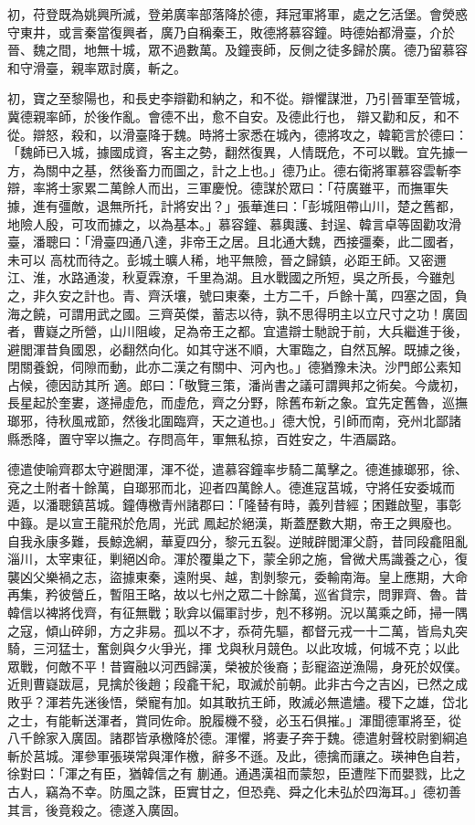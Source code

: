 \begin{pinyinscope}
 初，苻登既為姚興所滅，登弟廣率部落降於德，拜冠軍將軍，處之乞活堡。會熒惑守東井，或言秦當復興者，廣乃自稱秦王，敗德將慕容鐘。時德始都滑臺，介於晉、魏之間，地無十城，眾不過數萬。及鐘喪師，反側之徒多歸於廣。德乃留慕容和守滑臺，親率眾討廣，斬之。



 初，寶之至黎陽也，和長史李辯勸和納之，和不從。辯懼謀泄，乃引晉軍至管城，冀德親率師，於後作亂。會德不出，愈不自安。及德此行也，
 辯又勸和反，和不從。辯怒，殺和，以滑臺降于魏。時將士家悉在城內，德將攻之，韓範言於德曰：「魏師已入城，據國成資，客主之勢，翻然復異，人情既危，不可以戰。宜先據一方，為關中之基，然後畜力而圖之，計之上也。」德乃止。德右衛將軍慕容雲斬李辯，率將士家累二萬餘人而出，三軍慶悅。德謀於眾曰：「苻廣雖平，而撫軍失據，進有彊敵，退無所托，計將安出？」張華進曰：「彭城阻帶山川，楚之舊都，地險人殷，可攻而據之，以為基本。」慕容鐘、慕輿護、封逞、韓言卓等固勸攻滑臺，潘聰曰：「滑臺四通八達，非帝王之居。且北通大魏，西接彊秦，此二國者，未可以
 高枕而待之。彭城土曠人稀，地平無險，晉之歸鎮，必距王師。又密邇江、淮，水路通浚，秋夏霖潦，千里為湖。且水戰國之所短，吳之所長，今雖剋之，非久安之計也。青、齊沃壤，號曰東秦，土方二千，戶餘十萬，四塞之固，負海之饒，可謂用武之國。三齊英傑，蓄志以待，孰不思得明主以立尺寸之功！廣固者，曹嶷之所營，山川阻峻，足為帝王之都。宜遣辯士馳說于前，大兵繼進于後，避閭渾昔負國恩，必翻然向化。如其守迷不順，大軍臨之，自然瓦解。既據之後，閉關養銳，伺隙而動，此亦二漢之有關中、河內也。」德猶豫未決。沙門郎公素知占候，德因訪其所
 適。郎曰：「敬覽三策，潘尚書之議可謂興邦之術矣。今歲初，長星起於奎婁，遂掃虛危，而虛危，齊之分野，除舊布新之象。宜先定舊魯，巡撫瑯邪，待秋風戒節，然後北圍臨齊，天之道也。」德大悅，引師而南，兗州北鄙諸縣悉降，置守宰以撫之。存問高年，軍無私掠，百姓安之，牛酒屬路。



 德遣使喻齊郡太守避閭渾，渾不從，遣慕容鐘率步騎二萬擊之。德進據瑯邪，徐、兗之土附者十餘萬，自瑯邪而北，迎者四萬餘人。德進寇莒城，守將任安委城而遁，以潘聰鎮莒城。鐘傳檄青州諸郡曰：「隆替有時，義列昔經；困難啟聖，事彰中籙。是以宣王龍飛於危周，光武
 鳳起於絕漢，斯蓋歷數大期，帝王之興廢也。自我永康多難，長鯨逸網，華夏四分，黎元五裂。逆賊辟閭渾父蔚，昔同段龕阻亂淄川，太宰東征，剿絕凶命。渾於覆巢之下，蒙全卵之施，曾微犬馬識養之心，復襲凶父樂禍之志，盜據東秦，遠附吳、越，割剝黎元，委輸南海。皇上應期，大命再集，矜彼營丘，暫阻王略，故以七州之眾二十餘萬，巡省貸宗，問罪齊、魯。昔韓信以裨將伐齊，有征無戰；耿弇以偏軍討步，剋不移朔。況以萬乘之師，掃一隅之寇，傾山碎卵，方之非易。孤以不才，忝荷先驅，都督元戎一十二萬，皆烏丸突騎，三河猛士，奮劍與夕火爭光，揮
 戈與秋月競色。以此攻城，何城不克；以此眾戰，何敵不平！昔竇融以河西歸漢，榮被於後裔；彭寵盜逆漁陽，身死於奴僕。近則曹嶷跋扈，見擒於後趙；段龕干紀，取滅於前朝。此非古今之吉凶，已然之成敗乎？渾若先迷後悟，榮寵有加。如其敢抗王師，敗滅必無遣燼。稷下之雄，岱北之士，有能斬送渾者，賞同佐命。脫履機不發，必玉石俱摧。」渾聞德軍將至，從八千餘家入廣固。諸郡皆承檄降於德。渾懼，將妻子奔于魏。德遣射聲校尉劉綱追斬於莒城。渾參軍張瑛常與渾作檄，辭多不遜。及此，德擒而讓之。瑛神色自若，徐對曰：「渾之有臣，猶韓信之有
 蒯通。通遇漢祖而蒙恕，臣遭陛下而嬰戮，比之古人，竊為不幸。防風之誅，臣實甘之，但恐堯、舜之化未弘於四海耳。」德初善其言，後竟殺之。德遂入廣固。




\end{pinyinscope}
